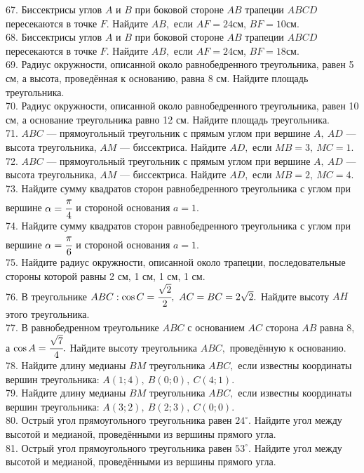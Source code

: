\documentclass[12pt]{article}
\begin{document}
67. Биссектрисы углов $A$ и $B$ при боковой стороне $AB$ трапеции $ABCD$ пересекаются в точке $F.$ Найдите $AB,$ если $AF=24$см, $BF=10$см.\\
68. Биссектрисы углов $A$ и $B$ при боковой стороне $AB$ трапеции $ABCD$ пересекаются в точке $F.$ Найдите $AB,$ если $AF=24$см, $BF=18$см.\\
69. Радиус окружности, описанной около равнобедренного треугольника, равен 5 см, а высота, проведённая к основанию, равна 8 см. Найдите площадь треугольника.\\
70. Радиус окружности, описанной около равнобедренного треугольника, равен 10 см, а основание треугольника равно 12 см. Найдите площадь треугольника.\\
71. $ABC$ --- прямоугольный треугольник с прямым углом при вершине $A,\ AD$ --- высота треугольника, $AM$ --- биссектриса. Найдите $AD,$ если $MB=3,\ MC=1.$\\
72. $ABC$ --- прямоугольный треугольник с прямым углом при вершине $A,\ AD$ --- высота треугольника, $AM$ --- биссектриса. Найдите $AD,$ если $MB=2,\ MC=4.$\\
73. Найдите сумму квадратов сторон равнобедренного треугольника с углом при вершине $\alpha=\cfrac{\pi}{4}$ и стороной основания $a=1.$\\
74. Найдите сумму квадратов сторон равнобедренного треугольника с углом при вершине $\alpha=\cfrac{\pi}{6}$ и стороной основания $a=1.$\\
75. Найдите радиус окружности, описанной около трапеции, последовательные стороны которой равны 2 см, 1 см, 1 см, 1 см.\\
76. В треугольнике $ABC: \cos C=\cfrac{\sqrt{2}}{2},\ AC=BC=2\sqrt{2}.$ Найдите высоту $AH$ этого треугольника.\\
77. В равнобедренном треугольнике $ABC$ с основанием $AC$ сторона $AB$ равна 8, а $\cos A=\cfrac{\sqrt{7}}{4}.$ Найдите высоту треугольника $ABC,$ проведённую к основанию.\\
78. Найдите длину медианы $BM$ треугольника $ABC,$ если известны координаты вершин треугольника: $A(1;4),\ B(0;0),\ C(4;1).$\\
79. Найдите длину медианы $BM$ треугольника $ABC,$ если известны координаты вершин треугольника: $A(3;2),\ B(2;3),\ C(0;0).$\\
80. Острый угол прямоугольного треугольника равен $24^\circ.$ Найдите угол между высотой и медианой, проведёнными из вершины прямого угла.\\
81. Острый угол прямоугольного треугольника равен $53^\circ.$ Найдите угол между высотой и медианой, проведёнными из вершины прямого угла.\\
\end{document}
